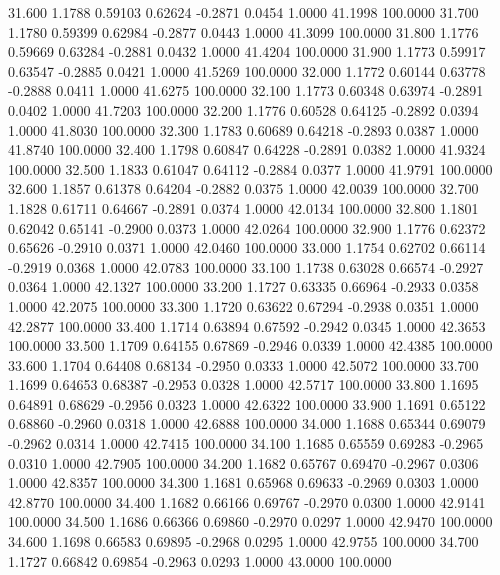   31.600   1.1788   0.59103   0.62624  -0.2871   0.0454   1.0000  41.1998 100.0000
  31.700   1.1780   0.59399   0.62984  -0.2877   0.0443   1.0000  41.3099 100.0000
  31.800   1.1776   0.59669   0.63284  -0.2881   0.0432   1.0000  41.4204 100.0000
  31.900   1.1773   0.59917   0.63547  -0.2885   0.0421   1.0000  41.5269 100.0000
  32.000   1.1772   0.60144   0.63778  -0.2888   0.0411   1.0000  41.6275 100.0000
  32.100   1.1773   0.60348   0.63974  -0.2891   0.0402   1.0000  41.7203 100.0000
  32.200   1.1776   0.60528   0.64125  -0.2892   0.0394   1.0000  41.8030 100.0000
  32.300   1.1783   0.60689   0.64218  -0.2893   0.0387   1.0000  41.8740 100.0000
  32.400   1.1798   0.60847   0.64228  -0.2891   0.0382   1.0000  41.9324 100.0000
  32.500   1.1833   0.61047   0.64112  -0.2884   0.0377   1.0000  41.9791 100.0000
  32.600   1.1857   0.61378   0.64204  -0.2882   0.0375   1.0000  42.0039 100.0000
  32.700   1.1828   0.61711   0.64667  -0.2891   0.0374   1.0000  42.0134 100.0000
  32.800   1.1801   0.62042   0.65141  -0.2900   0.0373   1.0000  42.0264 100.0000
  32.900   1.1776   0.62372   0.65626  -0.2910   0.0371   1.0000  42.0460 100.0000
  33.000   1.1754   0.62702   0.66114  -0.2919   0.0368   1.0000  42.0783 100.0000
  33.100   1.1738   0.63028   0.66574  -0.2927   0.0364   1.0000  42.1327 100.0000
  33.200   1.1727   0.63335   0.66964  -0.2933   0.0358   1.0000  42.2075 100.0000
  33.300   1.1720   0.63622   0.67294  -0.2938   0.0351   1.0000  42.2877 100.0000
  33.400   1.1714   0.63894   0.67592  -0.2942   0.0345   1.0000  42.3653 100.0000
  33.500   1.1709   0.64155   0.67869  -0.2946   0.0339   1.0000  42.4385 100.0000
  33.600   1.1704   0.64408   0.68134  -0.2950   0.0333   1.0000  42.5072 100.0000
  33.700   1.1699   0.64653   0.68387  -0.2953   0.0328   1.0000  42.5717 100.0000
  33.800   1.1695   0.64891   0.68629  -0.2956   0.0323   1.0000  42.6322 100.0000
  33.900   1.1691   0.65122   0.68860  -0.2960   0.0318   1.0000  42.6888 100.0000
  34.000   1.1688   0.65344   0.69079  -0.2962   0.0314   1.0000  42.7415 100.0000
  34.100   1.1685   0.65559   0.69283  -0.2965   0.0310   1.0000  42.7905 100.0000
  34.200   1.1682   0.65767   0.69470  -0.2967   0.0306   1.0000  42.8357 100.0000
  34.300   1.1681   0.65968   0.69633  -0.2969   0.0303   1.0000  42.8770 100.0000
  34.400   1.1682   0.66166   0.69767  -0.2970   0.0300   1.0000  42.9141 100.0000
  34.500   1.1686   0.66366   0.69860  -0.2970   0.0297   1.0000  42.9470 100.0000
  34.600   1.1698   0.66583   0.69895  -0.2968   0.0295   1.0000  42.9755 100.0000
  34.700   1.1727   0.66842   0.69854  -0.2963   0.0293   1.0000  43.0000 100.0000
